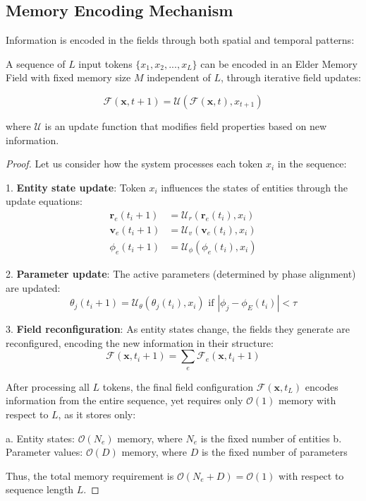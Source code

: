 \subsection{Memory Encoding Mechanism}

Information is encoded in the fields through both spatial and temporal patterns:

\begin{theorem}
A sequence of $L$ input tokens $\{x_1, x_2, ..., x_L\}$ can be encoded in an Elder Memory Field with fixed memory size $M$ independent of $L$, through iterative field updates:

\begin{equation}
\mathcal{F}(\mathbf{x}, t+1) = \mathcal{U}(\mathcal{F}(\mathbf{x}, t), x_{t+1})
\end{equation}

where $\mathcal{U}$ is an update function that modifies field properties based on new information.
\end{theorem}

\begin{proof}
Let us consider how the system processes each token $x_i$ in the sequence:

1. \textbf{Entity state update}: Token $x_i$ influences the states of entities through the update equations:
   \begin{align}
   \mathbf{r}_e(t_i+1) &= \mathcal{U}_r(\mathbf{r}_e(t_i), x_i) \\
   \mathbf{v}_e(t_i+1) &= \mathcal{U}_v(\mathbf{v}_e(t_i), x_i) \\
   \phi_e(t_i+1) &= \mathcal{U}_\phi(\phi_e(t_i), x_i)
   \end{align}

2. \textbf{Parameter update}: The active parameters (determined by phase alignment) are updated:
   \begin{equation}
   \theta_j(t_i+1) = \mathcal{U}_\theta(\theta_j(t_i), x_i) \text{ if } |\phi_j - \phi_E(t_i)| < \tau
   \end{equation}

3. \textbf{Field reconfiguration}: As entity states change, the fields they generate are reconfigured, encoding the new information in their structure:
   \begin{equation}
   \mathcal{F}(\mathbf{x}, t_i+1) = \sum_{e} \mathcal{F}_e(\mathbf{x}, t_i+1)
   \end{equation}

After processing all $L$ tokens, the final field configuration $\mathcal{F}(\mathbf{x}, t_L)$ encodes information from the entire sequence, yet requires only $\mathcal{O}(1)$ memory with respect to $L$, as it stores only:

a. Entity states: $\mathcal{O}(N_e)$ memory, where $N_e$ is the fixed number of entities
b. Parameter values: $\mathcal{O}(D)$ memory, where $D$ is the fixed number of parameters

Thus, the total memory requirement is $\mathcal{O}(N_e + D) = \mathcal{O}(1)$ with respect to sequence length $L$.
\end{proof}

